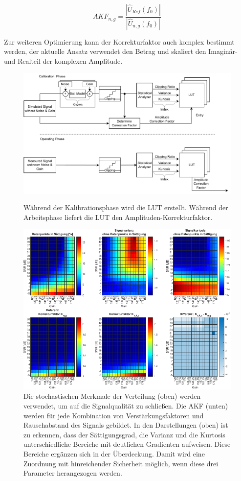 \begin{equation}
	\label{eq:corr}
	AKF_{n,g} = \frac{|\hat{U}_{Ref}(f_0)|}{|\hat{U}_{n,g}(f_0)|}
\end{equation}

Zur weiteren Optimierung kann der Korrekturfaktor auch komplex bestimmt werden, der aktuelle Ansatz verwendet den Betrag und skaliert den Imaginär- und Realteil der komplexen Amplitude.

\begin{figure}[h!]
	\centering
	\includegraphics[width=.9\textwidth]{../img/factor.pdf}
	\caption{Während der Kalibrationsphase wird die LUT erstellt. Während der Arbeitsphase liefert die LUT den Amplituden-Korrekturfaktor.}
	\label{fig:factor_eval} 
%
	\centering
	\includegraphics[width=.85\textwidth]{../img/lut.pdf}
	\caption{Die stochastischen Merkmale der Verteilung (oben) werden verwendet, um auf die Signalqualität zu schließen. Die AKF (unten) werden für jede Kombination von Verstärkungsfaktoren und Rauschabstand des Signals gebildet. In den Darstellungen (oben) ist zu erkennen, dass der Sättigungsgrad, die Varianz und die Kurtosis unterschiedliche Bereiche mit deutlichen Gradienten aufweisen. Diese Bereiche ergänzen sich in der Überdeckung. Damit wird eine Zuordnung mit hinreichender Sicherheit möglich, wenn diese drei Parameter herangezogen werden.}
	\label{fig:lut} 
\end{figure}

